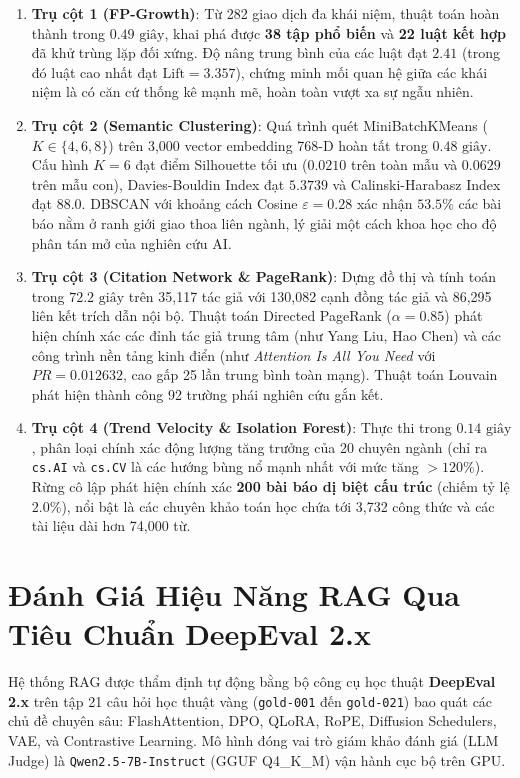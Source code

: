 \begin{enumerate}[label=\textbf{\arabic*.}]
  \item \textbf{Trụ cột 1 (FP-Growth)}:
    Từ 282 giao dịch đa khái niệm, thuật toán hoàn thành trong \textbf{$0.49\text{ giây}$}, khai phá được \textbf{38 tập phổ biến} và \textbf{22 luật kết hợp} đã khử trùng lặp đối xứng. Độ nâng trung bình của các luật đạt $2.41$ (trong đó luật cao nhất đạt $\text{Lift} = 3.357$), chứng minh mối quan hệ giữa các khái niệm là có căn cứ thống kê mạnh mẽ, hoàn toàn vượt xa sự ngẫu nhiên.
  \item \textbf{Trụ cột 2 (Semantic Clustering)}:
    Quá trình quét MiniBatchKMeans ($K \in \{4, 6, 8\}$) trên 3,000 vector embedding 768-D hoàn tất trong \textbf{$0.48\text{ giây}$}. Cấu hình $K=6$ đạt điểm Silhouette tối ưu ($0.0210$ trên toàn mẫu và $0.0629$ trên mẫu con), Davies-Bouldin Index đạt $5.3739$ và Calinski-Harabasz Index đạt $88.0$. DBSCAN với khoảng cách Cosine $\varepsilon=0.28$ xác nhận $53.5\%$ các bài báo nằm ở ranh giới giao thoa liên ngành, lý giải một cách khoa học cho độ phân tán mở của nghiên cứu AI.
  \item \textbf{Trụ cột 3 (Citation Network \& PageRank)}:
    Dựng đồ thị và tính toán trong \textbf{$72.2\text{ giây}$} trên 35,117 tác giả với 130,082 cạnh đồng tác giả và 86,295 liên kết trích dẫn nội bộ. Thuật toán Directed PageRank ($\alpha=0.85$) phát hiện chính xác các đỉnh tác giả trung tâm (như Yang Liu, Hao Chen) và các công trình nền tảng kinh điển (như \textit{Attention Is All You Need} với $PR = 0.012632$, cao gấp 25 lần trung bình toàn mạng). Thuật toán Louvain phát hiện thành công 92 trường phái nghiên cứu gắn kết.
  \item \textbf{Trụ cột 4 (Trend Velocity \& Isolation Forest)}:
    Thực thi trong \textbf{$0.14\text{ giây}$}, phân loại chính xác động lượng tăng trưởng của 20 chuyên ngành (chỉ ra \texttt{cs.AI} và \texttt{cs.CV} là các hướng bùng nổ mạnh nhất với mức tăng $>120\%$). Rừng cô lập phát hiện chính xác \textbf{200 bài báo dị biệt cấu trúc} (chiếm tỷ lệ $2.0\%$), nổi bật là các chuyên khảo toán học chứa tới 3,732 công thức và các tài liệu dài hơn 74,000 từ.
\end{enumerate}

\section{Đánh Giá Hiệu Năng RAG Qua Tiêu Chuẩn DeepEval 2.x}

Hệ thống RAG được thẩm định tự động bằng bộ công cụ học thuật \textbf{DeepEval 2.x} trên tập 21 câu hỏi học thuật vàng (\texttt{gold-001} đến \texttt{gold-021}) bao quát các chủ đề chuyên sâu: FlashAttention, DPO, QLoRA, RoPE, Diffusion Schedulers, VAE, và Contrastive Learning. Mô hình đóng vai trò giám khảo đánh giá (LLM Judge) là \texttt{Qwen2.5-7B-Instruct} (GGUF Q4\_K\_M) vận hành cục bộ trên GPU.

